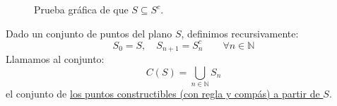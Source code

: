 \begin{figure}
    \centering
        \caption{Prueba gráfica de que $S\subseteq S^c$.}
        \label{fig:prueba_grafica}
\end{figure}

\begin{definicion}
    Dado un conjunto de puntos del plano $S$, definimos recursivamente:
    \begin{equation*}
        S_0 = S, \quad S_{n+1} = S_n^c \qquad \forall n\in \mathbb{N}
    \end{equation*}
    Llamamos al conjunto:
    \begin{equation*}
        C(S) = \bigcup_{n\in \mathbb{N}}S_n
    \end{equation*}
    el conjunto de \underline{los puntos constructibles (con regla y compás) a partir de $S$}.
\end{definicion}

